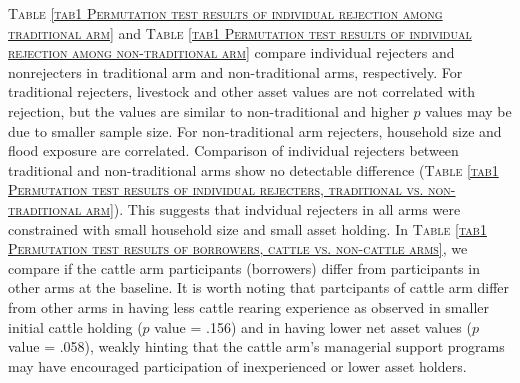 	\textsc{\normalsize Table \ref{tab1 Permutation test results of individual rejection among traditional arm}} and \textsc{\normalsize Table \ref{tab1 Permutation test results of individual rejection among non-traditional arm}} compare individual rejecters and nonrejecters in \textsf{traditional} arm and non-\textsf{traditional} arms, respectively. For \textsf{traditional} rejecters, livestock and other asset values are not correlated with rejection, but the values are similar to non-\textsf{traditional} and higher $p$ values may be due to smaller sample size. For non-\textsf{traditional} arm rejecters, household size and flood exposure are correlated. Comparison of individual rejecters between \textsf{traditional} and non-\textsf{traditional} arms show no detectable difference (\textsc{\normalsize Table \ref{tab1 Permutation test results of individual rejecters, traditional vs. non-traditional arm}}). This suggests that indvidual rejecters in all arms were constrained with small household size and small asset holding. In \textsc{\normalsize Table \ref{tab1 Permutation test results of borrowers, cattle vs. non-cattle arms}}, we compare if the \textsf{cattle} arm participants (borrowers) differ from participants in other arms at the baseline. It is worth noting that partcipants of \textsf{cattle} arm differ from other arms in having less cattle rearing experience as observed in smaller initial cattle holding ($p$ value = .156) and in having lower net asset values ($p$ value = .058), weakly hinting that the \textsf{cattle} arm's managerial support programs may have encouraged participation of inexperienced or lower asset holders. \label{RejectionLastPage}




